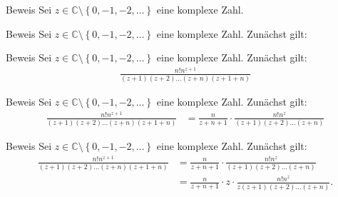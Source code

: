 \documentclass[10pt]{beamer}
\def\bC{\mathbb{C}}
\begin{document}
\begin{frame}{Beweis}
    Sei \( z \in \bC \setminus \left\{ 0, -1, -2, \ldots \right\} \) eine komplexe Zahl. 
\end{frame}



\begin{frame}{Beweis}
    Sei \( z \in \bC \setminus \left\{ 0, -1, -2, \ldots \right\} \) eine komplexe Zahl. Zunächst gilt: 
\end{frame}



\begin{frame}{Beweis}
    Sei \( z \in \bC \setminus \left\{ 0, -1, -2, \ldots \right\} \) eine komplexe Zahl. Zunächst gilt:
    \begin{align*}
        \frac{n! n^{z + 1}}{\left( z + 1 \right) \left( z + 2 \right) \ldots \left( z + n \right) \left( z + 1 + n \right)}
    \end{align*}
\end{frame}



\begin{frame}{Beweis}
    Sei \( z \in \bC \setminus \left\{ 0, -1, -2, \ldots \right\} \) eine komplexe Zahl. Zunächst gilt:
    \begin{align*}
        \frac{n! n^{z + 1}}{\left( z + 1 \right) \left( z + 2 \right) \ldots \left( z + n \right) \left( z + 1 + n \right)}
        & = \frac{n}{z + n + 1} \cdot \frac{n! n^{z}}{\left( z + 1 \right) \left( z + 2 \right) \ldots \left( z + n \right)}
    \end{align*}
\end{frame}



\begin{frame}{Beweis}
    Sei \( z \in \bC \setminus \left\{ 0, -1, -2, \ldots \right\} \) eine komplexe Zahl. Zunächst gilt:
    \begin{align*}
        \frac{n! n^{z + 1}}{\left( z + 1 \right) \left( z + 2 \right) \ldots \left( z + n \right) \left( z + 1 + n \right)}
        & = \frac{n}{z + n + 1} \cdot \frac{n! n^{z}}{\left( z + 1 \right) \left( z + 2 \right) \ldots \left( z + n \right)} \\
        & = \frac{n}{z + n + 1} \cdot z \cdot \frac{n! n^{z}}{z \left( z + 1 \right) \left( z + 2 \right) \ldots \left( z + n \right)}.
    \end{align*}
\end{frame}
\end{document}

